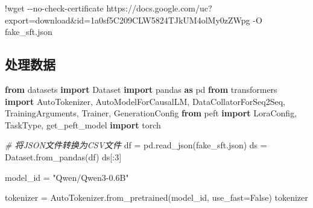 \documentclass[
]{article}
\newenvironment{Shaded}{}{}
\newcommand{\CommentTok}[1]{\textcolor[rgb]{0.38,0.63,0.69}{\textit{#1}}}
\newcommand{\DecValTok}[1]{\textcolor[rgb]{0.25,0.63,0.44}{#1}}
\newcommand{\ImportTok}[1]{\textcolor[rgb]{0.00,0.50,0.00}{\textbf{#1}}}
\newcommand{\NormalTok}[1]{#1}
\newcommand{\OperatorTok}[1]{\textcolor[rgb]{0.40,0.40,0.40}{#1}}
\newcommand{\StringTok}[1]{\textcolor[rgb]{0.25,0.44,0.63}{#1}}
\newcommand{\VariableTok}[1]{\textcolor[rgb]{0.10,0.09,0.49}{#1}}
\begin{document}
\begin{Shaded}
\begin{Highlighting}[]
\OperatorTok{!}\NormalTok{wget }\OperatorTok{{-}{-}}\NormalTok{no}\OperatorTok{{-}}\NormalTok{check}\OperatorTok{{-}}\NormalTok{certificate }\StringTok{\textquotesingle{}https://docs.google.com/uc?export=download\&id=1a0sf5C209CLW5824TJkUM4olMy0zZWpg\textquotesingle{}} \OperatorTok{{-}}\NormalTok{O fake\_sft.json}
\end{Highlighting}
\end{Shaded}

\subsection{处理数据}\label{ux5904ux7406ux6570ux636e}

\begin{Shaded}
\begin{Highlighting}[]
\ImportTok{from}\NormalTok{ datasets }\ImportTok{import}\NormalTok{ Dataset}
\ImportTok{import}\NormalTok{ pandas }\ImportTok{as}\NormalTok{ pd}
\ImportTok{from}\NormalTok{ transformers }\ImportTok{import}\NormalTok{ AutoTokenizer, AutoModelForCausalLM, DataCollatorForSeq2Seq, TrainingArguments, Trainer, GenerationConfig}
\ImportTok{from}\NormalTok{ peft }\ImportTok{import}\NormalTok{ LoraConfig, TaskType, get\_peft\_model}
\ImportTok{import}\NormalTok{ torch}
\end{Highlighting}
\end{Shaded}

\begin{Shaded}
\begin{Highlighting}[]
\CommentTok{\# 将JSON文件转换为CSV文件}
\NormalTok{df }\OperatorTok{=}\NormalTok{ pd.read\_json(}\StringTok{\textquotesingle{}fake\_sft.json\textquotesingle{}}\NormalTok{)}
\NormalTok{ds }\OperatorTok{=}\NormalTok{ Dataset.from\_pandas(df)}
\NormalTok{ds[:}\DecValTok{3}\NormalTok{]}
\end{Highlighting}
\end{Shaded}

\begin{Shaded}
\begin{Highlighting}[]
\NormalTok{model\_id }\OperatorTok{=} \StringTok{"Qwen/Qwen3{-}0.6B"}
\end{Highlighting}
\end{Shaded}

\begin{Shaded}
\begin{Highlighting}[]
\NormalTok{tokenizer }\OperatorTok{=}\NormalTok{ AutoTokenizer.from\_pretrained(model\_id, use\_fast}\OperatorTok{=}\VariableTok{False}\NormalTok{)}
\NormalTok{tokenizer}
\end{Highlighting}
\end{Shaded}
\end{document}
